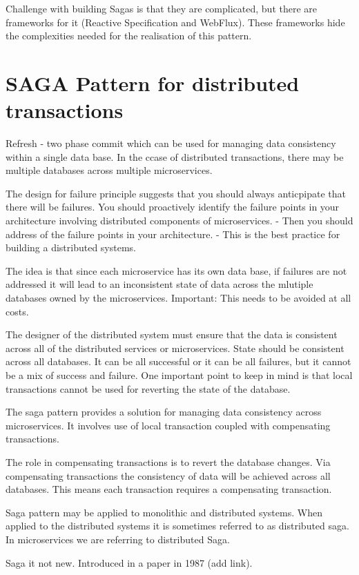 Challenge with building Sagas is that they are complicated, but there are frameworks for it (Reactive Specification and WebFlux).
These frameworks hide the complexities needed for the realisation of this pattern.

\section{SAGA Pattern for distributed transactions}
Refresh - two phase commit which can be used for managing data consistency within a single data base.
In the ccase of distributed transactions, there may be multiple databases across multiple microservices.

The design for failure principle suggests that you should always anticpipate that there will be failures.
You should proactively identify the failure points in your architecture involving distributed components of microservices.
- Then you should address of the failure points in your architecture.
- This is the best practice for building a distributed systems.

The idea is that since each microservice has its own data base, if failures are not addressed it will lead to an inconsistent state of data across the mlutiple databases owned by the microservices.
Important: This needs to be avoided at all costs.

The designer of the distributed system must ensure that the data is consistent across all of the distributed services or microservices.
State should be consistent across all databases.
It can be all successful or it can be all failures, but it cannot be a mix of success and failure.
One important point to keep in mind is that local transactions cannot be used for reverting the state of the database.

The saga pattern provides a solution for managing data consistency across microservices.
It involves use of local transaction coupled with compensating transactions.

The role in compensating transactions is to revert the database changes.
Via compensating transactions the consistency of data will be achieved across all databases.
This means each transaction requires a compensating transaction.

Saga pattern may be applied to monolithic and distributed systems.
When applied to the distributed systems it is sometimes referred to as distributed saga.
In microservices we are referring to distributed Saga.

Saga it not new. Introduced in a paper in 1987 (add link).


